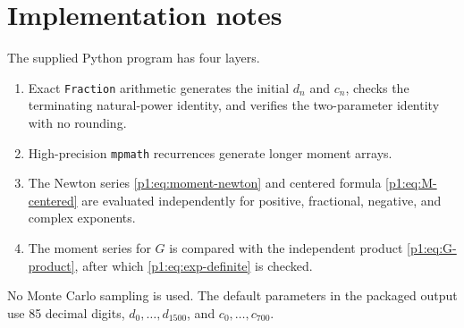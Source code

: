 \documentclass[11pt,oneside]{article}
\theoremstyle{definition}
\theoremstyle{remark}
\newcommand{\1}{\mathbf 1}
\begin{document}
\section{Implementation notes}

The supplied Python program has four layers.
\begin{enumerate}
\item Exact \texttt{Fraction} arithmetic generates the initial \(d_n\) and
      \(c_n\), checks the terminating natural-power identity, and verifies the
      two-parameter identity with no rounding.
\item High-precision \texttt{mpmath} recurrences generate longer moment arrays.
\item The Newton series \eqref{p1:eq:moment-newton} and centered formula
      \eqref{p1:eq:M-centered} are evaluated independently for positive,
      fractional, negative, and complex exponents.
\item The moment series for \(G\) is compared with the independent product
      \eqref{p1:eq:G-product}, after which \eqref{p1:eq:exp-definite} is checked.
\end{enumerate}
No Monte Carlo sampling is used.  The default parameters in the packaged
output use 85 decimal digits, \(d_0,\ldots,d_{1500}\), and
\(c_0,\ldots,c_{700}\).
\end{document}
